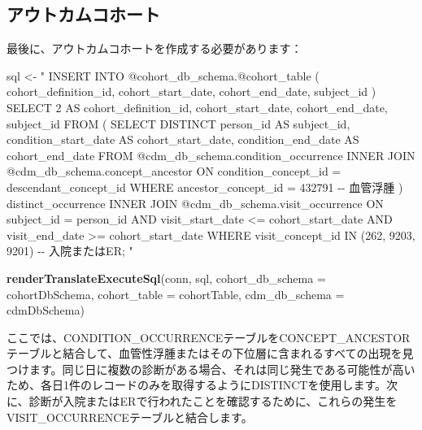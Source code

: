 \documentclass[
  11pt]{book}
\newenvironment{Shaded}{\begin{snugshade}}{\end{snugshade}}
\newcommand{\AttributeTok}[1]{\textcolor[rgb]{0.13,0.29,0.53}{#1}}
\newcommand{\FunctionTok}[1]{\textcolor[rgb]{0.13,0.29,0.53}{\textbf{#1}}}
\newcommand{\NormalTok}[1]{#1}
\newcommand{\OtherTok}[1]{\textcolor[rgb]{0.56,0.35,0.01}{#1}}
\newcommand{\StringTok}[1]{\textcolor[rgb]{0.31,0.60,0.02}{#1}}
\theoremstyle{definition}
\theoremstyle{definition}
\theoremstyle{definition}
\theoremstyle{definition}
\theoremstyle{remark}
\begin{document}
\subsection{アウトカムコホート}\label{ux30a2ux30a6ux30c8ux30abux30e0ux30b3ux30dbux30fcux30c8}

最後に、アウトカムコホートを作成する必要があります：

\begin{Shaded}
\begin{Highlighting}[]
\NormalTok{sql }\OtherTok{\textless{}{-}} \StringTok{"}
\StringTok{INSERT INTO @cohort\_db\_schema.@cohort\_table (}
\StringTok{ cohort\_definition\_id,}
\StringTok{ cohort\_start\_date,}
\StringTok{ cohort\_end\_date,}
\StringTok{subject\_id}
\StringTok{)}
\StringTok{SELECT 2 AS cohort\_definition\_id,}
\StringTok{  cohort\_start\_date,}
\StringTok{  cohort\_end\_date,}
\StringTok{  subject\_id}
\StringTok{FROM (}
\StringTok{  SELECT DISTINCT person\_id AS subject\_id,}
\StringTok{    condition\_start\_date AS cohort\_start\_date,}
\StringTok{    condition\_end\_date AS cohort\_end\_date}
\StringTok{  FROM @cdm\_db\_schema.condition\_occurrence}
\StringTok{  INNER JOIN @cdm\_db\_schema.concept\_ancestor}
\StringTok{    ON condition\_concept\_id = descendant\_concept\_id}
\StringTok{  WHERE ancestor\_concept\_id = 432791 {-}{-} 血管浮腫}
\StringTok{) distinct\_occurrence}
\StringTok{INNER JOIN @cdm\_db\_schema.visit\_occurrence}
\StringTok{  ON subject\_id = person\_id}
\StringTok{  AND visit\_start\_date \textless{}= cohort\_start\_date}
\StringTok{  AND visit\_end\_date \textgreater{}= cohort\_start\_date}
\StringTok{WHERE visit\_concept\_id IN (262, 9203,}
\StringTok{    9201) {-}{-} 入院またはER;}
\StringTok{"}

\FunctionTok{renderTranslateExecuteSql}\NormalTok{(conn, sql,}
                          \AttributeTok{cohort\_db\_schema =}\NormalTok{ cohortDbSchema,}
                          \AttributeTok{cohort\_table =}\NormalTok{ cohortTable,}
                          \AttributeTok{cdm\_db\_schema =}\NormalTok{ cdmDbSchema)}
\end{Highlighting}
\end{Shaded}

ここでは、CONDITION\_OCCURRENCEテーブルをCONCEPT\_ANCESTORテーブルと結合して、血管性浮腫またはその下位層に含まれるすべての出現を見つけます。同じ日に複数の診断がある場合、それは同じ発生である可能性が高いため、各日1件のレコードのみを取得するようにDISTINCTを使用します。次に、診断が入院またはERで行われたことを確認するために、これらの発生をVISIT\_OCCURRENCEテーブルと結合します。
\end{document}
